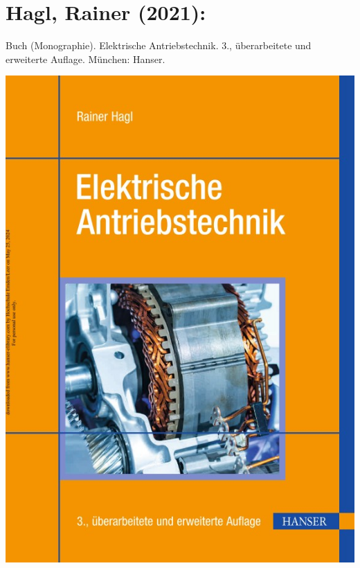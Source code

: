 \section*{Hagl, Rainer (2021):}
Buch (Monographie). Elektrische Antriebstechnik.
3., überarbeitete und erweiterte Auflage. München: Hanser. \\
\begin{minipage}{0.5\textwidth}
	\includegraphics[width=\linewidth]{../Appendix/Literaturverzeichnis/img/Hagl.jpg}
\end{minipage}
\hfill
